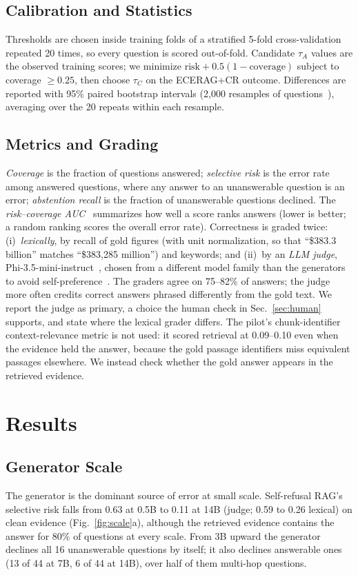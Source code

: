 \documentclass[conference,letterpaper]{IEEEtran}
\newcommand{\tA}{\tau_A}
\newcommand{\tC}{\tau_C}
\begin{document}
\subsection{Calibration and Statistics}
Thresholds are chosen inside training folds of a stratified 5-fold cross-validation repeated 20
times, so every question is scored out-of-fold. Candidate $\tA$ values are the observed training
scores; we minimize $\text{risk}+0.5(1-\text{coverage})$ subject to coverage $\ge0.25$, then choose
$\tC$ on the ECERAG+CR outcome. Differences are reported with 95\% paired bootstrap intervals
(2{,}000 resamples of questions~\cite{efron1993bootstrap}), averaging over the 20 repeats within each
resample.

\subsection{Metrics and Grading}
\emph{Coverage} is the fraction of questions answered; \emph{selective risk} is the error rate
among answered questions, where any answer to an unanswerable question is an error;
\emph{abstention recall} is the fraction of unanswerable questions declined. The
\emph{risk--coverage AUC}~\cite{elyaniv2010} summarizes how well a score ranks answers (lower is
better; a random ranking scores the overall error rate). Correctness is graded twice:
(i)~\emph{lexically}, by recall of gold figures (with unit normalization, so that
``\$383.3 billion'' matches ``\$383,285 million'') and keywords; and (ii)~by an \emph{LLM judge},
Phi-3.5-mini-instruct~\cite{abdin2024phi3}, chosen from a different model family than the
generators to avoid self-preference~\cite{zheng2023judge}. The graders agree on 75--82\% of answers;
the judge more often credits correct answers phrased differently from the gold text. We report
the judge as primary, a choice the human check in Sec.~\ref{sec:human} supports, and state where
the lexical grader differs. The pilot's chunk-identifier context-relevance metric is not used: it
scored retrieval at 0.09--0.10 even when the evidence held the answer, because the gold passage
identifiers miss equivalent passages elsewhere. We instead check whether the gold answer appears
in the retrieved evidence.

\section{Results}
\subsection{Generator Scale}
The generator is the dominant source of error at small scale. Self-refusal RAG's selective risk
falls from 0.63 at 0.5B to 0.11 at 14B (judge; 0.59 to 0.26 lexical) on clean evidence
(Fig.~\ref{fig:scale}a), although the retrieved evidence contains the answer for 80\% of
questions at every scale. From 3B upward the generator declines all 16 unanswerable questions by
itself; it also declines answerable ones (13 of 44 at 7B, 6 of 44 at 14B), over half of them multi-hop questions.
\end{document}
